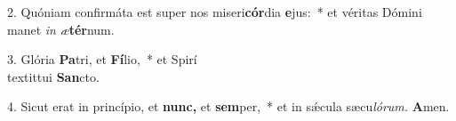\item 2. Quóniam confirmáta est super nos miseri\textbf{cór}dia \textbf{e}jus:~* et véritas Dómini manet \textit{in} \textit{æ}\textbf{tér}num.
\item 3. Glória \textbf{Pa}tri, et \textbf{Fí}lio,~* et Spirí\hspace{0.03em}\\textit{tui} \textbf{San}cto.
\item 4. Sicut erat in princípio, et \textbf{nunc,} et \textbf{sem}per,~* et in sǽcula sæcu\hspace{0.03em}\textit{lórum.} \textbf{A}men.
